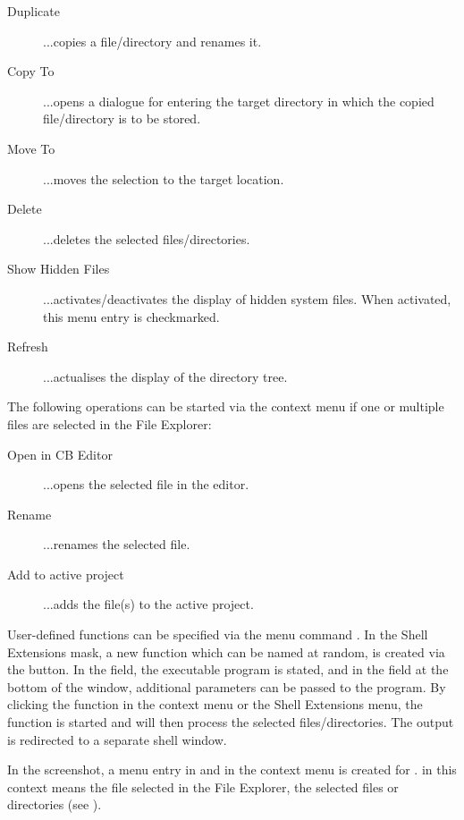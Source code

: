 \begin{description}
\item[Duplicate] ...copies a file/directory and renames it.
\item[Copy To] ...opens a dialogue for entering the target directory in which the copied file/directory is to be stored.
\item[Move To] ...moves the selection to the target location.
\item[Delete] ...deletes the selected files/directories.
\item[Show Hidden Files] ...activates/deactivates the display of hidden system files. When activated, this menu entry is checkmarked.
\item[Refresh] ...actualises the display of the directory tree.
\end{description}

The following operations can be started via the context menu if one or multiple files are selected in the File Explorer:

\begin{description}
\item[Open in CB Editor] ...opens the selected file in the \codeblocks editor.
\item[Rename] ...renames the selected file.
\item[Add to active project] ...adds the file(s) to the active project.
\end{description}


User-defined functions can be specified via the menu command . In the Shell Extensions mask, a new function which can be named at random, is created via the  button. In the  field, the executable program is stated, and in the field at the bottom of the window, additional parameters can be passed to the program.
By clicking the function in the context menu or the Shell Extensions menu, the function is started and will then process the selected files/directories. The output is redirected to a separate shell window.

In the screenshot, a menu entry in  and in the context menu is created for .  in this context means the file selected in the File Explorer,  the selected files or directories (see ).

